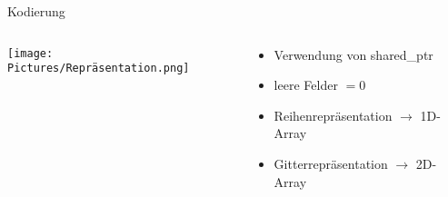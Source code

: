 \begin{frame}{Kodierung}
    \begin{columns}[T] %
        \begin{column}{0.75\textwidth}
            \texttt{[image: Pictures/Repräsentation.png]}
        \end{column}
        \begin{column}{0.35\textwidth}
            \begin{itemize}
                \item Verwendung von shared\_ptr
                \item leere Felder \(=0\)
                \item Reihenrepräsentation \(\rightarrow\) 1D-Array
                \item Gitterrepräsentation \(\rightarrow\) 2D-Array
            \end{itemize}
        \end{column}
    \end{columns}
\end{frame}
